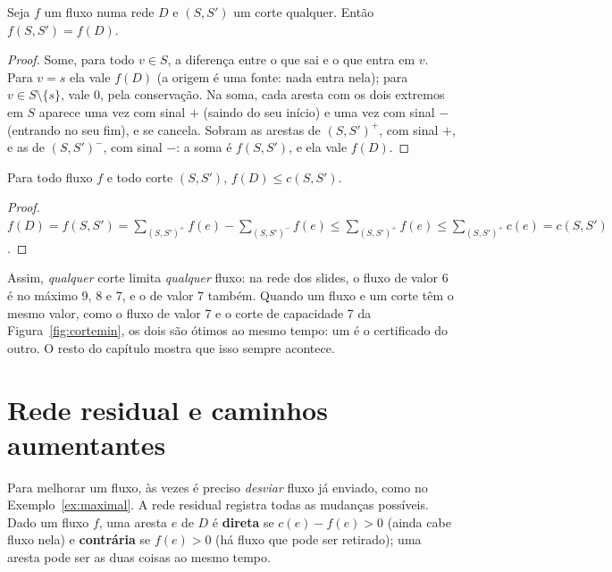 \begin{teo}\label{teo:fluxocorte}
Seja $f$ um fluxo numa rede $D$ e $(S,S')$ um corte qualquer. Então $f(S,S')=f(D)$.
\end{teo}
\begin{proof}
Some, para todo $v\in S$, a diferença entre o que sai e o que entra em $v$. Para $v=s$ ela vale $f(D)$ (a origem é uma fonte: nada entra nela); para $v\in S\setminus\{s\}$, vale 0, pela conservação. Na soma, cada aresta com os dois extremos em $S$ aparece uma vez com sinal $+$ (saindo do seu início) e uma vez com sinal $-$ (entrando no seu fim), e se cancela. Sobram as arestas de $(S,S')^+$, com sinal $+$, e as de $(S,S')^-$, com sinal $-$: a soma é $f(S,S')$, e ela vale $f(D)$.
\end{proof}

\begin{teo}\label{teo:cota}
Para todo fluxo $f$ e todo corte $(S,S')$, $f(D)\le c(S,S')$.
\end{teo}
\begin{proof}
$f(D)=f(S,S')=\sum_{(S,S')^+}f(e)-\sum_{(S,S')^-}f(e)\le\sum_{(S,S')^+}f(e)\le\sum_{(S,S')^+}c(e)=c(S,S')$.
\end{proof}
Assim, \emph{qualquer} corte limita \emph{qualquer} fluxo: na rede dos slides, o fluxo de valor 6 é no máximo 9, 8 e 7, e o de valor 7 também. Quando um fluxo e um corte têm o mesmo valor, como o fluxo de valor 7 e o corte de capacidade 7 da Figura~\ref{fig:cortemin}, os dois são ótimos ao mesmo tempo: um é o certificado do outro. O resto do capítulo mostra que isso sempre acontece.

\section{Rede residual e caminhos aumentantes}\label{sec:residual}
Para melhorar um fluxo, às vezes é preciso \emph{desviar} fluxo já enviado, como no Exemplo~\ref{ex:maximal}. A rede residual registra todas as mudanças possíveis. Dado um fluxo $f$, uma aresta $e$ de $D$ é \textbf{direta} se $c(e)-f(e)>0$ (ainda cabe fluxo nela) e \textbf{contrária} se $f(e)>0$ (há fluxo que pode ser retirado); uma aresta pode ser as duas coisas ao mesmo tempo.

